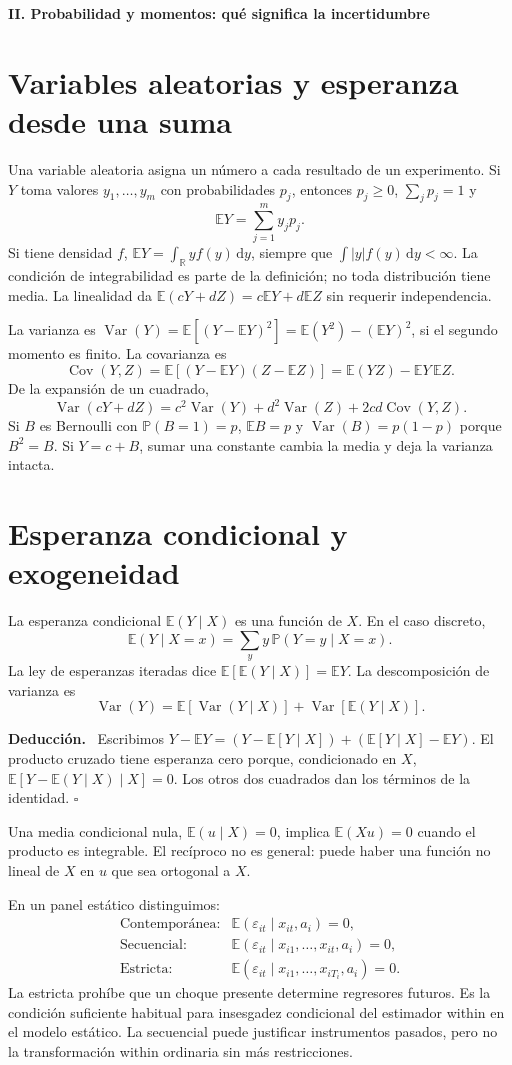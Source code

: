 \documentclass[11pt,a4paper]{article}
\newcommand{\R}{\mathbb R}
\newcommand{\E}{\mathbb E}
\newcommand{\Prob}{\mathbb P}
\newcommand{\dd}{\,\mathrm d}
\DeclareMathOperator{\Var}{Var}
\DeclareMathOperator{\Cov}{Cov}
\newenvironment{deduccion}{\par\textbf{Deducción.}\ }{\hfill$\square$\par}
\theoremstyle{definition}
\newcommand{\parte}[1]{\par\bigskip\Needspace{8\baselineskip}\begin{center}{\Large\bfseries\color{azul}#1}\end{center}}
\newcommand{\eps}{\varepsilon}
\begin{document}
\parte{II. Probabilidad y momentos: qué significa la incertidumbre}
\section{Variables aleatorias y esperanza desde una suma}
Una variable aleatoria asigna un número a cada resultado de un experimento. Si $Y$ toma valores $y_1,\ldots,y_m$ con probabilidades $p_j$, entonces $p_j\ge0$, $\sum_jp_j=1$ y
\[
\E Y=\sum_{j=1}^m y_jp_j.
\]
Si tiene densidad $f$, $\E Y=\int_\R y f(y)\dd y$, siempre que $\int|y|f(y)\dd y<\infty$. La condición de integrabilidad es parte de la definición; no toda distribución tiene media. La linealidad da $\E(cY+dZ)=c\E Y+d\E Z$ sin requerir independencia.

La varianza es $\Var(Y)=\E[(Y-\E Y)^2]=\E(Y^2)-(\E Y)^2$, si el segundo momento es finito. La covarianza es
\[
\Cov(Y,Z)=\E[(Y-\E Y)(Z-\E Z)]
=\E(YZ)-\E Y\,\E Z.
\]
De la expansión de un cuadrado,
\[
\Var(cY+dZ)=c^2\Var(Y)+d^2\Var(Z)+2cd\Cov(Y,Z).
\]
Si $B$ es Bernoulli con $\Prob(B=1)=p$, $\E B=p$ y $\Var(B)=p(1-p)$ porque $B^2=B$. Si $Y=c+B$, sumar una constante cambia la media y deja la varianza intacta.

\section{Esperanza condicional y exogeneidad}
La esperanza condicional $\E(Y\mid X)$ es una función de $X$. En el caso discreto,
\[
\E(Y\mid X=x)=\sum_y y\,\Prob(Y=y\mid X=x).
\]
La ley de esperanzas iteradas dice $\E[\E(Y\mid X)]=\E Y$. La descomposición de varianza es
\[
\Var(Y)=\E[\Var(Y\mid X)]+\Var[\E(Y\mid X)].
\]
\begin{deduccion}
Escribimos $Y-\E Y=(Y-\E[Y\mid X])+(\E[Y\mid X]-\E Y)$.
El producto cruzado tiene esperanza cero porque, condicionado en $X$,
$\E[Y-\E(Y\mid X)\mid X]=0$. Los otros dos cuadrados dan los términos de la identidad.
\end{deduccion}
Una media condicional nula, $\E(u\mid X)=0$, implica $\E(Xu)=0$ cuando el producto es integrable. El recíproco no es general: puede haber una función no lineal de $X$ en $u$ que sea ortogonal a $X$.

En un panel estático distinguimos:
\[
\begin{array}{ll}
\text{Contemporánea:}&\E(\eps_{it}\mid x_{it},a_i)=0,\\
\text{Secuencial:}&\E(\eps_{it}\mid x_{i1},\ldots,x_{it},a_i)=0,\\
\text{Estricta:}&\E(\eps_{it}\mid x_{i1},\ldots,x_{iT_i},a_i)=0.
\end{array}
\]
La estricta prohíbe que un choque presente determine regresores futuros. Es la condición suficiente habitual para insesgadez condicional del estimador within en el modelo estático. La secuencial puede justificar instrumentos pasados, pero no la transformación within ordinaria sin más restricciones.
\end{document}
